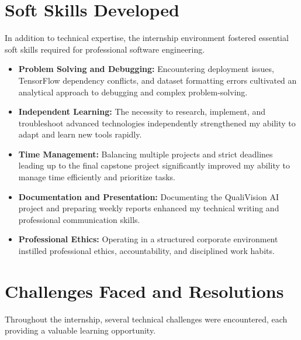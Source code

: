 \section{Soft Skills Developed}

In addition to technical expertise, the internship environment fostered essential soft skills required for professional software engineering.

\begin{itemize}[leftmargin=1.5cm]
    \item \textbf{Problem Solving and Debugging:} Encountering deployment issues, TensorFlow dependency conflicts, and dataset formatting errors cultivated an analytical approach to debugging and complex problem-solving.
    \item \textbf{Independent Learning:} The necessity to research, implement, and troubleshoot advanced technologies independently strengthened my ability to adapt and learn new tools rapidly.
    \item \textbf{Time Management:} Balancing multiple projects and strict deadlines leading up to the final capstone project significantly improved my ability to manage time efficiently and prioritize tasks.
    \item \textbf{Documentation and Presentation:} Documenting the QualiVision AI project and preparing weekly reports enhanced my technical writing and professional communication skills.
    \item \textbf{Professional Ethics:} Operating in a structured corporate environment instilled professional ethics, accountability, and disciplined work habits.
\end{itemize}

\section{Challenges Faced and Resolutions}

Throughout the internship, several technical challenges were encountered, each providing a valuable learning opportunity.

